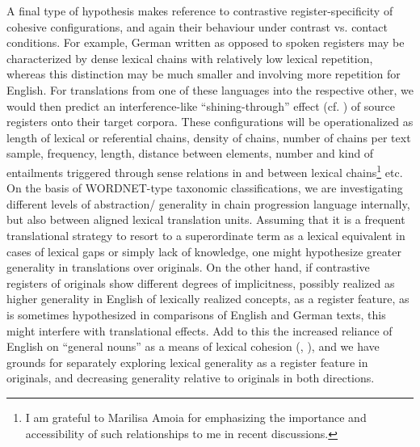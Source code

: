 \documentclass[output=paper]{LSP/langsci}
\begin{document}
\begin{exe}
\begin{exe}
\begin{exe}
\begin{exe}
\begin{exe}
A final type of hypothesis makes reference to contrastive register-specificity of cohesive configurations, and again their behaviour under contrast vs. contact conditions. For example, German written as opposed to spoken registers may be characterized by dense lexical chains with relatively low lexical repetition, whereas this distinction may be much smaller and involving more repetition for English. For translations from one of these languages into the respective other, we would then predict an interference-like ``shining-through'' effect (cf. \citealt{Teich2003}) of source registers onto their target corpora. These configurations will be operationalized as length of lexical or referential chains, density of chains, number of chains per text sample, frequency, length, distance between elements, number and kind of entailments triggered through sense relations in and between lexical chains\footnote{I am grateful to Marilisa Amoia for emphasizing the importance and accessibility of such relationships to me in recent discussions. } etc. On the basis of WORDNET-type taxonomic classifications, we are investigating different levels of abstraction/ generality in chain progression language internally, but also between aligned lexical translation units. Assuming that it is a frequent translational strategy to resort to a superordinate term as a lexical equivalent in cases of lexical gaps or simply lack of knowledge, one might hypothesize greater generality in translations over originals. On the other hand, if contrastive registers of originals show different degrees of implicitness, possibly realized as higher generality in English of lexically realized concepts, as a register feature, as is sometimes hypothesized in comparisons of English and German texts, this might interfere with translational effects. Add to this the increased reliance of English on ``general nouns'' as a means of lexical cohesion (\citealt{Schmid2000}, \citealt{Mahlberg2005}), and we have grounds for separately exploring lexical generality as a register feature in originals, and decreasing generality relative to originals in both directions. 


\end{exe}
\end{exe}
\end{exe}
\end{exe}
\end{exe}
\end{document}
